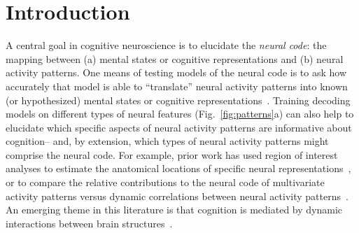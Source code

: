 \documentclass[english]{article}
\begin{document}
\section*{Introduction}
A central goal in cognitive neuroscience is to elucidate the
\textit{neural code}: the mapping between (a) mental states or
cognitive representations and (b) neural activity patterns. One means
of testing models of the neural code is to ask how accurately that
model is able to ``translate'' neural activity patterns into known (or
hypothesized) mental states or cognitive
representations~\citep[e.g.,][]{HaxbEtal01, NormEtal06, TongPrat12,
  MitcEtal08a, KamiTong05, NishEtal11, PereEtal18, HuthEtal12,
  HuthEtal16}.  Training decoding models on different types of neural
features (Fig.~\ref{fig:patterns}a) can also help to elucidate which
specific aspects of neural activity patterns are informative about
cognition-- and, by extension, which types of neural activity patterns
might comprise the neural code.  For example, prior work has used
region of interest analyses to estimate the anatomical locations of
specific neural representations~\citep[e.g.,][]{EtzeEtal09}, or to
compare the relative contributions to the neural code of multivariate
activity patterns versus dynamic correlations between neural activity
patterns~\citep[e.g.,][]{MannEtal18, FongEtal19}.  An emerging theme
in this literature is that cognition is mediated by dynamic
interactions between brain structures~\citep{SporHone06, BassEtal06,
  Turk13, DemeEtal19, SoloEtal19, LuriEtal18, PretEtal17, ZouEtal19,
  MackEtal17}.
\end{document}

